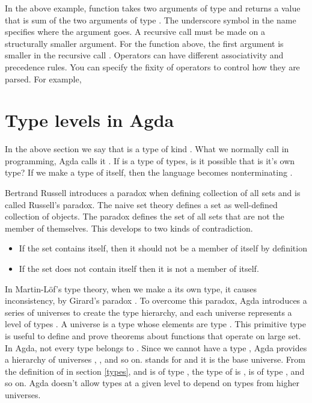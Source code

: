 In the above example, function \inline{_+_} takes two arguments of type
 and returns a value that is sum of the two arguments of type
. The underscore symbol in the name specifies where the argument
goes. A recursive call must be made on a structurally smaller argument. For the
function \inline{_+_} above, the first argument  is smaller in the
recursive call . Operators can have different associativity and
precedence rules. You can specify the fixity of operators to control how they
are parsed. For example,

\section{Type levels in Agda}
In the above section we say that  is a type of kind .
What we normally call  in programming, Agda calls it .
If  is a type of types, is it possible that  is it's own
type? If we make  a type of itself, then the language becomes
nonterminating \cite{AgdaTB}. 

Bertrand Russell introduces a paradox when defining collection of all sets and
is called Russell's paradox. The naive set theory defines a set as well-defined
collection of objects. The paradox \cite{russell2020principles} defines the set
of all sets that are not the member of themselves. This develops to two kinds of
contradiction.
\begin{itemize}
  \item If the set contains itself, then it should not be a member of itself by
  definition
  \item If the set does not contain itself then it is not a member of itself.
\end{itemize}

In Martin-Löf's type theory, when we make a  its own type, it causes
inconsistency, by Girard's paradox \cite{coquand1986analysis}. To overcome this
paradox, Agda introduces a series of universes to create the type hierarchy, and
each universe represents a level of types \cite{sortSystem}. A universe is a
type whose elements are type \cite{universeagda}. This primitive type is useful
to define and prove theorems about functions that operate on large set. In Agda,
not every type belongs to . Since we cannot have a type , Agda provides a hierarchy of universes , ,
 and so on.  stands for  and it is the
base universe. From the definition of  in section \ref{types},
 and  is of type , the type of
 is ,  is of type , and so on.
Agda doesn't allow types at a given level to depend on types from higher
universes.  

